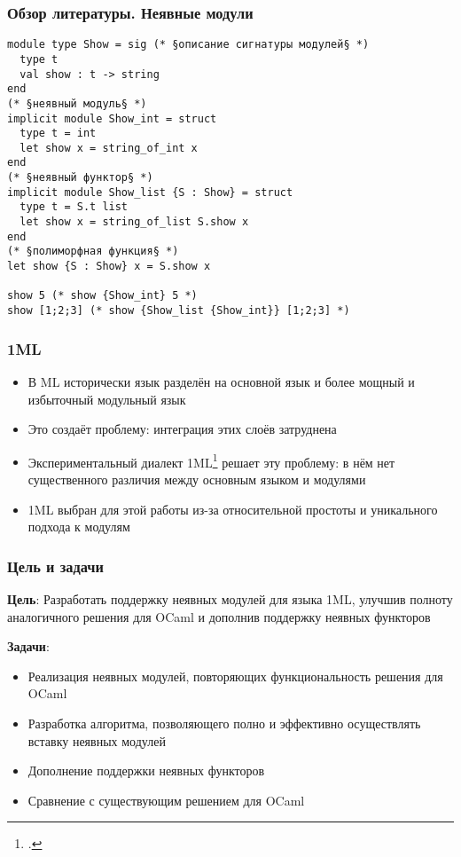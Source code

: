 \documentclass{beamer}
\begin{document}
\lstset{language=caml}
\begin{frame}[fragile]\frametitle{Обзор литературы. Неявные модули}
\begin{lstlisting}
module type Show = sig (* §описание сигнатуры модулей§ *)
  type t
  val show : t -> string
end
(* §неявный модуль§ *)
implicit module Show_int = struct 
  type t = int
  let show x = string_of_int x
end
(* §неявный функтор§ *)
implicit module Show_list {S : Show} = struct 
  type t = S.t list
  let show x = string_of_list S.show x
end
(* §полиморфная функция§ *)
let show {S : Show} x = S.show x 

show 5 (* show {Show_int} 5 *)
show [1;2;3] (* show {Show_list {Show_int}} [1;2;3] *)
\end{lstlisting}
\end{frame}

\begin{frame}\frametitle{1ML}
\begin{itemize}
  \item В ML исторически язык разделён на основной язык и более мощный и избыточный модульный язык
  \item Это создаёт проблему: интеграция этих слоёв затруднена
  \item Экспериментальный диалект 1ML\footcite{1ml} решает эту проблему: в нём нет существенного различия между основным языком и модулями
  \item 1ML выбран для этой работы из-за относительной простоты и уникального подхода к модулям
\end{itemize}
\end{frame}

\begin{frame}\frametitle{Цель и задачи}
\textbf{Цель}: Разработать поддержку неявных модулей для языка 1ML, улучшив полноту аналогичного решения для OCaml и дополнив поддержку неявных функторов

\textbf{Задачи}:
\begin{itemize}
  \item Реализация неявных модулей, повторяющих функциональность решения для OCaml
  \item Разработка алгоритма, позволяющего полно и эффективно осуществлять вставку неявных модулей
  \item Дополнение поддержки неявных функторов
  \item Сравнение с существующим решением для OCaml
\end{itemize}
\end{frame}
\end{document}

